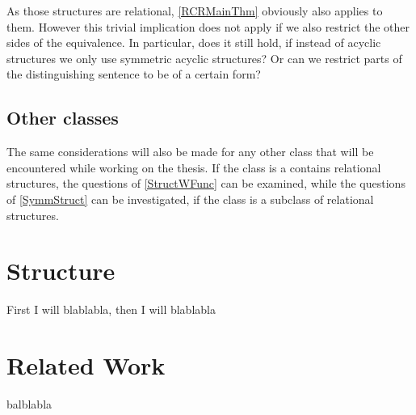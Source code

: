 \documentclass[a4paper,11pt,DIV=15]{scrartcl} %
\theoremstyle{plain}
\theoremstyle{definition}
\begin{document}
As those structures are relational, \cref{RCRMainThm} obviously also applies to them.
However this trivial implication does not apply if we also restrict the other sides of the equivalence.
In particular, does it still hold, if instead of acyclic structures we only use symmetric acyclic structures?
Or can we restrict parts of the distinguishing sentence to be of a certain form?
\label{SymmStruct}

\subsection{Other classes}

The same considerations will also be made for any other class that will be encountered while working on the thesis.
If the class is a contains relational structures, the questions of \cref{StructWFunc} can be examined, while the questions of \cref{SymmStruct} can be investigated, if the class is a subclass of relational structures.

\section{Structure}

First I will blablabla, then I will blablabla


\section{Related Work}

balblabla



\end{document}
